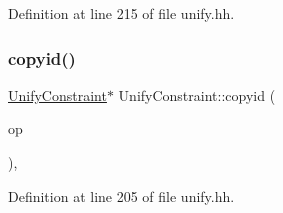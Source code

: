 Definition at line 215 of file unify.\+hh.

\mbox{\label{class_unify_constraint_ad437d193c74ae8e03077da359df718c2}} 
\subsubsection{\texorpdfstring{copyid()}{copyid()}}
{\footnotesize\ttfamily \mbox{\hyperlink{class_unify_constraint}{Unify\+Constraint}}$\ast$ Unify\+Constraint\+::copyid (\begin{DoxyParamCaption}\item[{const \mbox{\hyperlink{class_unify_constraint}{Unify\+Constraint}} $\ast$}]{op }\end{DoxyParamCaption})\hspace{0.3cm}{\ttfamily [inline]}, {\ttfamily [protected]}}



Definition at line 205 of file unify.\+hh.

